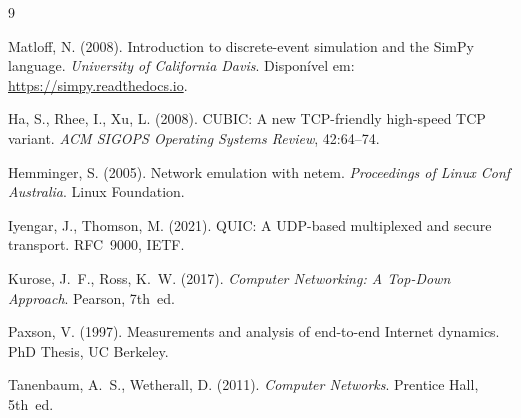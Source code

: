 \documentclass[12pt]{article}
\begin{document}

\begin{thebibliography}{9}

Matloff, N. (2008). Introduction to discrete-event simulation and the SimPy language.
\textit{University of California Davis}. Disponível em: \url{https://simpy.readthedocs.io}.

Ha, S., Rhee, I., Xu, L. (2008). CUBIC: A new TCP-friendly high-speed TCP variant.
\textit{ACM SIGOPS Operating Systems Review}, 42:64--74.

Hemminger, S. (2005). Network emulation with netem.
\textit{Proceedings of Linux Conf Australia}. Linux Foundation.

Iyengar, J., Thomson, M. (2021). QUIC: A UDP-based multiplexed and secure transport.
RFC~9000, IETF.

Kurose, J.~F., Ross, K.~W. (2017).
\textit{Computer Networking: A Top-Down Approach}. Pearson, 7th~ed.

Paxson, V. (1997). Measurements and analysis of end-to-end Internet dynamics.
PhD Thesis, UC Berkeley.

Tanenbaum, A.~S., Wetherall, D. (2011).
\textit{Computer Networks}. Prentice Hall, 5th~ed.

\end{thebibliography}
\end{document}
